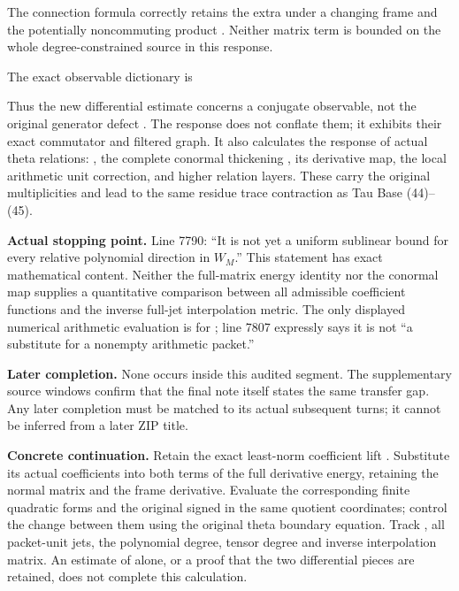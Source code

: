 
The connection formula correctly retains the extra
\protect{} under a changing frame and the potentially
noncommuting product \protect{}.
Neither matrix term is bounded on the whole degree-constrained source in
this response.

The exact observable dictionary is


Thus the new differential estimate concerns a conjugate observable, not
the original generator defect \protect{}. The response does not
conflate them; it exhibits their exact commutator and filtered graph. It
also calculates the response of actual theta relations:
\protect{}, the complete
conormal thickening \protect{}, its derivative map, the local
arithmetic unit correction, and higher relation layers. These carry the
original multiplicities and lead to the same residue trace contraction
as Tau Base (44)--(45).

\textbf{Actual stopping point.} Line 7790: ``It is not yet a uniform
sublinear bound for every relative polynomial direction in \(W_M\).''
This statement has exact mathematical content. Neither the full-matrix
energy identity nor the conormal map supplies a quantitative comparison
between all admissible coefficient functions and the inverse full-jet
interpolation metric. The only displayed numerical arithmetic evaluation
is for \protect{}; line 7807 expressly says it is not ``a
substitute for a nonempty arithmetic packet.''

\textbf{Later completion.} None occurs inside this audited segment. The
supplementary source windows confirm that the final note itself states
the same transfer gap. Any later completion must be matched to its
actual subsequent turns; it cannot be inferred from a later ZIP title.

\textbf{Concrete continuation.} Retain the exact least-norm coefficient
lift \protect{}. Substitute its
actual coefficients into both terms of the full derivative energy,
retaining the normal matrix and the frame derivative. Evaluate the
corresponding finite quadratic forms and the original signed
\protect{} in the same quotient coordinates; control the
change between them using the original theta boundary equation. Track
\protect{}, all packet-unit jets, the polynomial degree,
tensor degree and inverse interpolation matrix. An estimate of
\protect{} alone, or a proof that the two differential
pieces are retained, does not complete this calculation.

